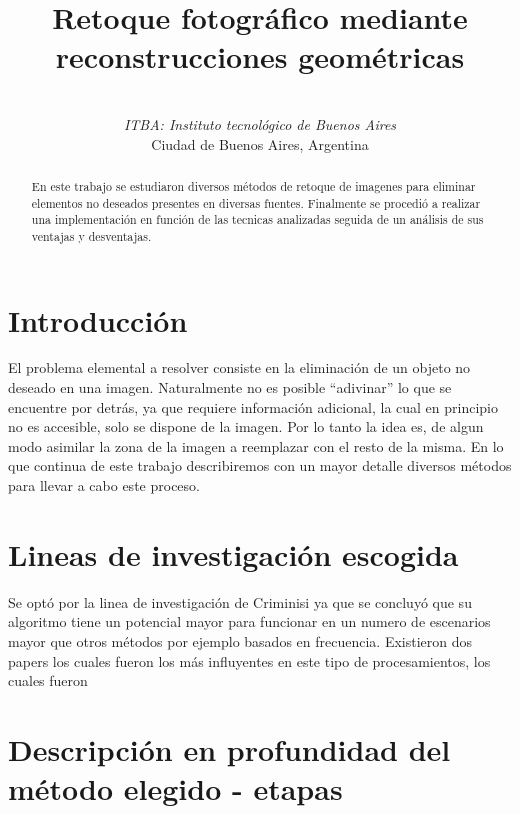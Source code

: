 \documentclass[conference]{IEEEtran}
\begin{document}
\title{Retoque fotográfico mediante reconstrucciones geométricas}
\author{
 \\
\textit{ITBA: Instituto tecnológico de Buenos Aires}\\
Ciudad de Buenos Aires, Argentina
}
\maketitle

\begin{abstract}
En este trabajo se estudiaron
 diversos métodos de retoque de imagenes para eliminar elementos no deseados presentes en diversas fuentes. Finalmente se procedió a realizar una implementación en función de las tecnicas analizadas seguida de un análisis de sus ventajas y desventajas.
\end{abstract}

\section{Introducción}
El problema elemental a resolver consiste en la eliminación de un objeto no deseado en una imagen.
Naturalmente no es posible ``adivinar'' lo que se encuentre por detrás, ya que requiere información adicional, la cual en principio no es accesible, solo se dispone de la imagen. Por lo tanto la idea es, de algun modo asimilar la zona de la imagen a reemplazar con el resto de la misma. En lo que continua de este trabajo describiremos con un mayor detalle diversos métodos para llevar a cabo este proceso.



\section{Lineas de investigación escogida}
Se optó por la linea de investigación de Criminisi ya que se concluyó que su algoritmo tiene un potencial mayor para funcionar en un numero de escenarios mayor que otros métodos por ejemplo basados en frecuencia. Existieron dos papers los cuales fueron los más influyentes en este tipo de procesamientos, los cuales fueron 

\section{Descripción en profundidad del método elegido - etapas}
\end{document}
